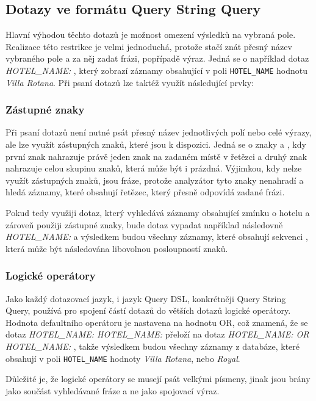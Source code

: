 \documentclass[czech,BP]{thesiskiv}
\begin{document}
\subsection{Dotazy ve formátu Query String Query}
Hlavní výhodou těchto dotazů je možnost omezení výsledků na vybraná pole. Realizace této restrikce je velmi jednoduchá, protože stačí znát přesný název vybraného pole a za něj zadat frázi, popřípadě výraz. Jedná se o například dotaz \textit{HOTEL\_NAME: }, který zobrazí záznamy obsahující v poli \texttt{HOTEL\_NAME} hodnotu \textit{Villa Rotana}. Při psaní dotazů lze taktéž využít následující prvky:

\subsubsection{Zástupné znaky}
Při psaní dotazů není nutné psát přesný název jednotlivých polí nebo celé výrazy, ale lze využít zástupných znaků, které jsou k dispozici. Jedná se o znaky  a \uv{*}, kdy první znak nahrazuje právě jeden znak na zadaném místě v řetězci a druhý znak nahrazuje celou skupinu znaků, která může být i prázdná. Výjimkou, kdy nelze využít zástupných znaků, jsou fráze, protože analyzátor tyto znaky nenahradí a hledá záznamy, které obsahují řetězec, který přesně odpovídá zadané frázi.


Pokud tedy využiji dotaz, který vyhledává záznamy obsahující zmínku o hotelu  a zároveň použiji zástupné znaky, bude dotaz vypadat například následovně \textit{HOTEL\_NAME: } a výsledkem budou všechny záznamy, které obsahují sekvenci , která může být následována libovolnou posloupností znaků.

\subsubsection{Logické operátory}
Jako každý dotazovací jazyk, i jazyk Query DSL, konkrétněji Query String Query, používá pro spojení částí dotazů do větších dotazů logické operátory. Hodnota defaultního operátoru je nastavena na hodnotu OR, což znamená, že se dotaz\textit{ HOTEL\_NAME:  HOTEL\_NAME:  } přeloží na dotaz \textit{HOTEL\_NAME:  OR HOTEL\_NAME:  }, takže výsledkem budou všechny záznamy z databáze, které obsahují v poli \texttt{HOTEL\_NAME} hodnoty \textit{Villa Rotana}, nebo \textit{Royal}.


Důležité je, že logické operátory se musejí psát velkými písmeny, jinak jsou brány jako součást vyhledávané fráze a ne jako spojovací výraz.
\end{document}
